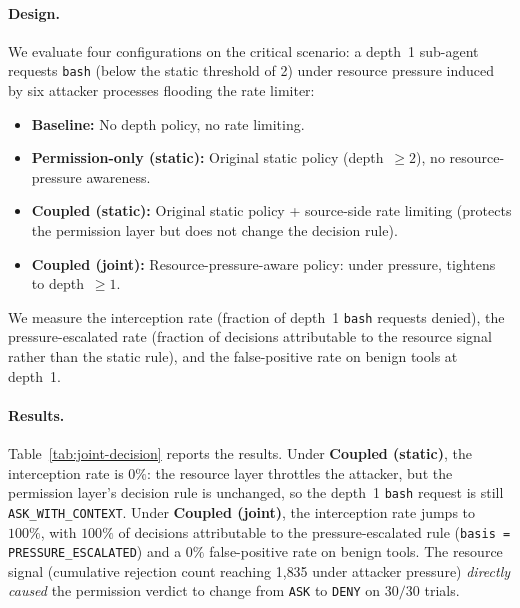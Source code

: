 \paragraph{Design.}
We evaluate four configurations on the critical scenario: a depth~1
sub-agent requests \texttt{bash} (below the static threshold of 2) under
resource pressure induced by six attacker processes flooding the rate
limiter:
\begin{itemize}
    \item \textbf{Baseline:} No depth policy, no rate limiting.
    \item \textbf{Permission-only (static):} Original static policy
    (depth~$\geq 2$), no resource-pressure awareness.
    \item \textbf{Coupled (static):} Original static policy + source-side
    rate limiting (protects the permission layer but does not change the
    decision rule).
    \item \textbf{Coupled (joint):} Resource-pressure-aware policy:
    under pressure, tightens to depth~$\geq 1$.
\end{itemize}
We measure the interception rate (fraction of depth~1 \texttt{bash}
requests denied), the pressure-escalated rate (fraction of decisions
attributable to the resource signal rather than the static rule), and
the false-positive rate on benign tools at depth~1.

\paragraph{Results.}
Table~\ref{tab:joint-decision} reports the results. Under
\textbf{Coupled (static)}, the interception rate is $0\%$: the resource
layer throttles the attacker, but the permission layer's decision rule
is unchanged, so the depth~1 \texttt{bash} request is still
\texttt{ASK\_WITH\_CONTEXT}. Under \textbf{Coupled (joint)}, the
interception rate jumps to $100\%$, with $100\%$ of decisions
attributable to the pressure-escalated rule (\texttt{basis =
PRESSURE\_ESCALATED}) and a $0\%$ false-positive rate on benign tools.
The resource signal (cumulative rejection count reaching 1{,}835 under
attacker pressure) \emph{directly caused} the permission verdict to
change from \texttt{ASK} to \texttt{DENY} on $30/30$ trials.

